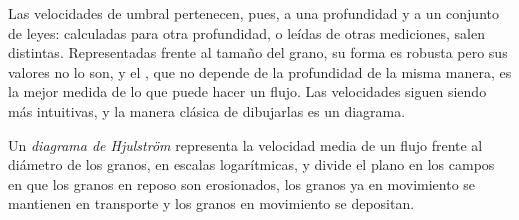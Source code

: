 Las velocidades de umbral pertenecen, pues, a una profundidad y a un conjunto de leyes: calculadas para otra profundidad, o leídas de otras mediciones, salen
distintas. Representadas frente al tamaño del grano, su forma es robusta pero sus valores no lo son, y el , que no depende de la
profundidad de la misma manera, es la mejor medida de lo que puede hacer un flujo. Las velocidades siguen siendo más intuitivas, y la manera clásica de
dibujarlas es un diagrama.

\begin{definition}\label{def:b1:erosion-transport:hjulstrom}
Un \emph{diagrama de Hjulström} representa la velocidad media de un flujo frente al diámetro de los granos, en escalas logarítmicas,
y divide el plano en los campos en que los granos en reposo son erosionados, los granos ya en movimiento se mantienen en transporte y los granos en movimiento
se depositan.
\end{definition}

